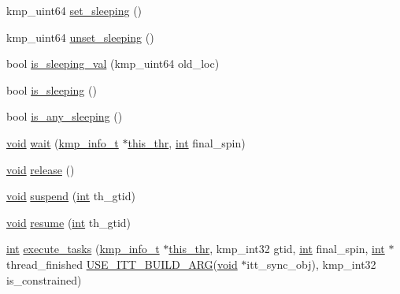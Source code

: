 \begin{DoxyCompactItemize}
\item 
kmp\-\_\-uint64 \hyperlink{classkmp__flag__oncore_af2242352965827fa81565fa0e1c35923}{set\-\_\-sleeping} ()
\item 
kmp\-\_\-uint64 \hyperlink{classkmp__flag__oncore_ab49b33119f15328b5c3b558fc3a938ce}{unset\-\_\-sleeping} ()
\item 
bool \hyperlink{classkmp__flag__oncore_a9ca49d662830fecc0022c80414a61809}{is\-\_\-sleeping\-\_\-val} (kmp\-\_\-uint64 old\-\_\-loc)
\item 
bool \hyperlink{classkmp__flag__oncore_a5177877a542322bc2cae59b265eca65a}{is\-\_\-sleeping} ()
\item 
bool \hyperlink{classkmp__flag__oncore_a092f6705d0ab102361b377a6b54d6cc2}{is\-\_\-any\-\_\-sleeping} ()
\item 
\hyperlink{ittnotify__static_8h_af941d56e55e3c5465135b60c4d6343ed}{void} \hyperlink{classkmp__flag__oncore_a69885e3623201f8b51a79c7f034ce175}{wait} (\hyperlink{kmp_8h_a194859801fe16b326efe34501a37c30a}{kmp\-\_\-info\-\_\-t} $\ast$\hyperlink{classkmp__flag__oncore_ab6a0844b7170dfffc0c9a748eaa5690e}{this\-\_\-thr}, \hyperlink{ittnotify__static_8h_a8b8dcd723308a8cb5d84277c7a3fff70}{int} final\-\_\-spin)
\item 
\hyperlink{ittnotify__static_8h_af941d56e55e3c5465135b60c4d6343ed}{void} \hyperlink{classkmp__flag__oncore_a2935978e9898c8f13ee16961c134973c}{release} ()
\item 
\hyperlink{ittnotify__static_8h_af941d56e55e3c5465135b60c4d6343ed}{void} \hyperlink{classkmp__flag__oncore_a83acf5ba45be02b9bedead4674b2da64}{suspend} (\hyperlink{ittnotify__static_8h_a8b8dcd723308a8cb5d84277c7a3fff70}{int} th\-\_\-gtid)
\item 
\hyperlink{ittnotify__static_8h_af941d56e55e3c5465135b60c4d6343ed}{void} \hyperlink{classkmp__flag__oncore_aefad9aaf4ab859af794cfa9dd0ac0c0a}{resume} (\hyperlink{ittnotify__static_8h_a8b8dcd723308a8cb5d84277c7a3fff70}{int} th\-\_\-gtid)
\item 
\hyperlink{ittnotify__static_8h_a8b8dcd723308a8cb5d84277c7a3fff70}{int} \hyperlink{classkmp__flag__oncore_a7bfbc86e21492e2d13f11f64423fa331}{execute\-\_\-tasks} (\hyperlink{kmp_8h_a194859801fe16b326efe34501a37c30a}{kmp\-\_\-info\-\_\-t} $\ast$\hyperlink{classkmp__flag__oncore_ab6a0844b7170dfffc0c9a748eaa5690e}{this\-\_\-thr}, kmp\-\_\-int32 gtid, \hyperlink{ittnotify__static_8h_a8b8dcd723308a8cb5d84277c7a3fff70}{int} final\-\_\-spin, \hyperlink{ittnotify__static_8h_a8b8dcd723308a8cb5d84277c7a3fff70}{int} $\ast$thread\-\_\-finished \hyperlink{kmp__itt_8h_ac31864b9b5b30f5dcac5ab285ee97ae0}{U\-S\-E\-\_\-\-I\-T\-T\-\_\-\-B\-U\-I\-L\-D\-\_\-\-A\-R\-G}(\hyperlink{ittnotify__static_8h_af941d56e55e3c5465135b60c4d6343ed}{void} $\ast$itt\-\_\-sync\-\_\-obj), kmp\-\_\-int32 is\-\_\-constrained)

\end{DoxyCompactItemize}
